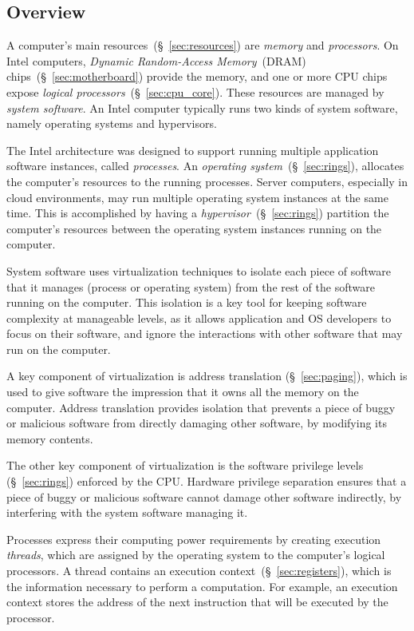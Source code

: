 \subsection{Overview}
\label{sec:background_overview}

A computer's main resources~(\S~\ref{sec:resources}) are \textit{memory} and
\textit{processors}. On Intel computers, \textit{Dynamic Random-Access
Memory}~(DRAM) chips~(\S~\ref{sec:motherboard}) provide the memory, and one or
more CPU chips expose \textit{logical processors}~(\S~\ref{sec:cpu_core}).
These resources are managed by \textit{system software}. An Intel computer
typically runs two kinds of system software, namely operating systems and
hypervisors.

The Intel architecture was designed to support running multiple application
software instances, called \textit{processes}. An
\textit{operating system}~(\S~\ref{sec:rings}), allocates the computer's
resources to the running processes. Server computers, especially in cloud
environments, may run multiple operating system instances at the same time.
This is accomplished by having a \textit{hypervisor}~(\S~\ref{sec:rings})
partition the computer's resources between the operating system instances
running on the computer.

System software uses virtualization techniques to isolate each piece of
software that it manages (process or operating system) from the rest of the
software running on the computer. This isolation is a key tool for keeping
software complexity at manageable levels, as it allows application and OS
developers to focus on their software, and ignore the interactions with other
software that may run on the computer.

A key component of virtualization is address translation (\S~\ref{sec:paging}),
which is used to give software the impression that it owns all the memory on
the computer. Address translation provides isolation that prevents a piece of
buggy or malicious software from directly damaging other software, by modifying
its memory contents.

The other key component of virtualization is the software privilege levels
(\S~\ref{sec:rings}) enforced by the CPU. Hardware privilege separation ensures
that a piece of buggy or malicious software cannot damage other software
indirectly, by interfering with the system software managing it.

Processes express their computing power requirements by creating execution
\textit{threads}, which are assigned by the operating system to the computer's
logical processors. A thread contains an execution
context~(\S~\ref{sec:registers}), which is the information necessary to
perform a computation. For example, an execution context stores the address of
the next instruction that will be executed by the processor.

